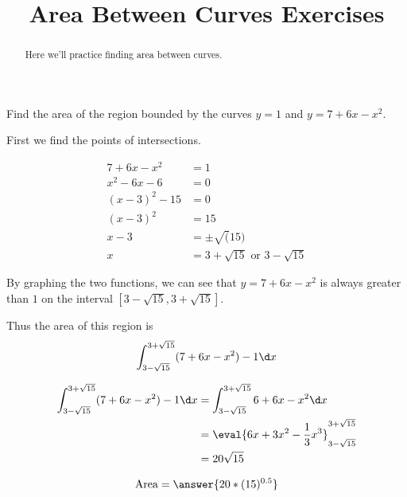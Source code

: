 \documentclass[handout]{ximera}
\title[Exercises:]{Area Between Curves Exercises}
\begin{document}
\begin{abstract}
  Here we'll practice finding area between curves.
\end{abstract}
\maketitle

\begin{exercise}
Find the area of the region bounded by the curves $y = 1$ and $y =7+6x-x^2$.

\begin{hint}
	First we find the points of intersections.
	
	\begin{align*}
	 7+6x-x^2 &= 1\\
	 x^2-6x-6 &= 0\\
	 (x-3)^2 - 15 &= 0\\
     (x-3)^2 &= 15 \\
     x-3 &= \pm \sqrt(15) \\
	 x &= 3 +\sqrt{15} \textrm{ or  }3 - \sqrt{15}
	\end{align*}
\end{hint}

\begin{hint}
	By graphing the two functions, we can see that $y =7+6x-x^2$ is always greater than $1$ on the interval $[3 - \sqrt{15}, 3 + \sqrt{15}]$.
\end{hint}

\begin{hint}
	Thus the area of this region is
	\[
	\int_{3-\sqrt{15}}^{3+\sqrt{15}} (7+6x-x^2) - 1 \d x
	\]
\end{hint}

\begin{hint}
	\begin{align*}
		\int_{3 - \sqrt{15}}^{3+\sqrt{15}} (7+6x-x^2) - 1 \d x &= \int_{3 - \sqrt{15}}^{3+\sqrt{15}} 6+6x-x^2 \d x\\
		&= \eval{6x+3x^2-\frac{1}{3}x^3}_{3 - \sqrt{15}}^{3+\sqrt{15}}\\
		&= 20\sqrt{15}
	\end{align*}
\end{hint}

	\[
		\textrm{Area} = \answer{20*(15)^{0.5}}
	\]

\end{exercise}
\end{document}
